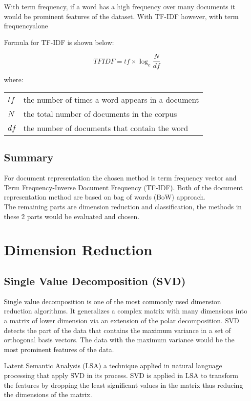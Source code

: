 With term frequency, if a word has a high frequency over many documents it would be prominent features of the dataset. With TF-IDF however, with term frequencyalone


Formula for TF-IDF is shown below:

\begin{equation}
TFIDF = tf \times \log_e \frac{N}{df}
\end{equation}
	
where:
	
\begin{center}
\begin{tabular}{l @{ $=$ } l}
	$tf$ & the number of times a word appears in a document \\
	$N$ & the total number of documents in the corpus \\
	$df$ & the number of documents that contain the word
\end{tabular}
\end{center}

\subsection{Summary}
For document representation the chosen method is term frequency vector and Term Frequency-Inverse Document Frequency (TF-IDF). Both of the document representation method are based on bag of words (BoW) approach.\\


The remaining parts are dimension reduction and classification, the methods in these 2 parts would be evaluated and chosen.
	
\section{Dimension Reduction}
\subsection{Single Value Decomposition (SVD)}
Single value decomposition is one of the most commonly used dimension reduction algorithms. It generalizes a complex matrix with many dimensions into a matrix of lower dimension via an extension of the polar decomposition. SVD detects the part of the data that contains the maximum variance in a set of orthogonal basis vectors. The data with the maximum variance would be the most prominent features of the data. \cite{svdDef}
	
Latent Semantic Analysis (LSA) a technique applied in natural language processing that apply SVD in its process. SVD is applied in LSA to transform the features by dropping the least significant values in the matrix thus reducing the dimensions of the matrix. \cite{fuzzyLash}
	
